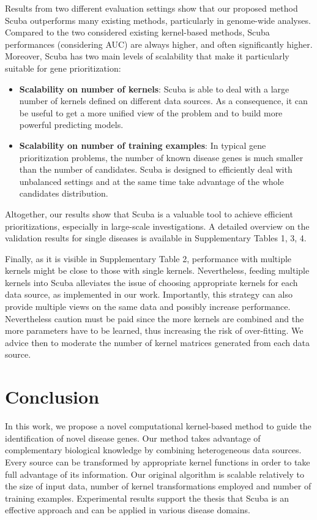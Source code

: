 \documentclass[twocolumn]{bmcart}%
\begin{document}
Results from two different evaluation settings show that our proposed method Scuba outperforms many existing methods, particularly in genome-wide analyses. Compared to the two considered existing kernel-based methods, Scuba performances (considering AUC) are always higher, and often significantly higher. Moreover, Scuba has two main levels of scalability that make it particularly suitable for gene prioritization:
\begin{itemize}
	\item \textbf{Scalability on number of kernels}: Scuba is able to deal with a large number of kernels defined on different data sources. As a consequence, it can be useful to get a more unified view of the problem and to build more powerful predicting models.
	
	\item \textbf{Scalability on number of training examples}: In typical gene prioritization problems, the number of known disease genes is much smaller than the number of candidates. Scuba is designed to efficiently deal with unbalanced settings and at the same time take advantage of the whole candidates distribution.
\end{itemize}

Altogether, our results show that Scuba is a valuable tool to achieve efficient prioritizations, especially in large-scale investigations. A detailed overview on the validation results for single diseases is available in Supplementary Tables 1, 3, 4.

Finally, as it is visible in Supplementary Table 2, performance with multiple kernels might be close to those with single kernels. Nevertheless, feeding multiple kernels into Scuba alleviates the issue of choosing appropriate kernels for each data source, as implemented in our work. Importantly, this strategy can also provide multiple views on the same data and possibly increase performance. Nevertheless caution must be paid since the more kernels are combined and the more parameters have to be learned, thus increasing the risk of over-fitting. We advice then to moderate the number of kernel matrices generated from each data source. 




\section*{Conclusion}
In this work, we propose a novel computational kernel-based method to guide the identification of novel disease genes. Our method takes advantage of complementary biological knowledge by combining heterogeneous data sources. Every source can be transformed by appropriate kernel functions in order to take full advantage of its information. Our original algorithm is scalable relatively to the size of input data, number of kernel transformations employed and number of training examples. Experimental results support the thesis that Scuba is an effective approach and can be applied in various disease domains.
\end{document}
